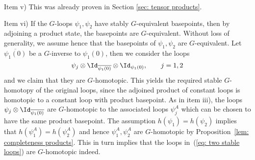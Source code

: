 Item v) This was already proven in Section \ref{sec: tensor products}.

Item vi)  If the $G$-loops $\psi_1,\psi_2$ have stably $G$-equivalent basepoints, then by adjoining a product state, the basepoints are $G$-equivalent. Without loss of generality, we assume hence that the basepoints of 
$\psi_1,\psi_2$ are $G$-equivalent. Let $\overline{\psi_1(0)}$ be a $G$-inverse to $\psi_1(0)$, then we consider the loops
\begin{equation} \label{eq: two stable loops}
	\psi_j \otimes \Id_{\overline{\psi_1(0)}}  \otimes \Id_{\psi_1(0)}, \qquad j=1,2
\end{equation}
and we claim that they are $G$-homotopic. This yields the required stable $G$-homotopy of the original loops, since the adjoined product of constant loops is homotopic to a constant  loop with product basepoint. As in item iii), the loops 
$
\psi_j \otimes \Id_{\overline{\psi_1(0)}} 
$
are $G$-homotopic to the associated loops $\psi^A_j$ which can be chosen to have the same product basepoint. The assumption $h(\psi_1)=h(\psi_2)$ implies that $h(\psi^A_1)=h(\psi^A_2)$ and hence $\psi^A_1,\psi^A_2$ are $G$-homotopic by Proposition~\ref{lem: completeness products}. This in turn implies that the loops in~(\ref{eq: two stable loops}) are $G$-homotopic indeed.

\cleardoublepage

